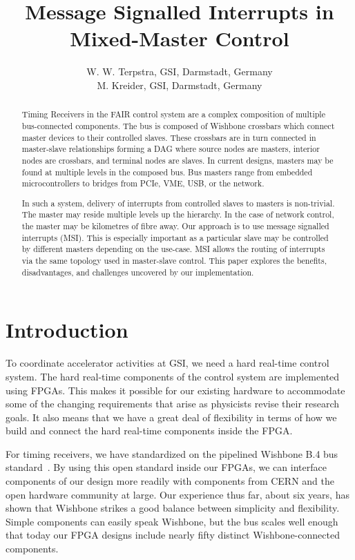 \documentclass[a4paper]{jacow}
\begin{document}
\title{Message Signalled Interrupts in Mixed-Master Control}

\author{W. W. Terpstra, GSI, Darmstadt, Germany\\
        M. Kreider, GSI, Darmstadt, Germany}
\maketitle

\begin{abstract}

Timing Receivers in the FAIR control system are a complex composition of
multiple bus-connected components. 
The bus is composed of Wishbone crossbars
which connect master devices to their controlled slaves. 
These crossbars are
in turn connected in master-slave relationships forming a DAG where source
nodes are masters, interior nodes are crossbars, and terminal nodes are
slaves. 
In current designs, masters may be found at multiple levels in the
composed bus. 
Bus masters range from embedded microcontrollers to 
bridges from PCIe, VME, USB, or the network. 

In such a
system, delivery of interrupts from controlled slaves to masters is
non-trivial. The master may reside multiple levels up the hierarchy. In the
case of network control, the master may be kilometres of fibre away. Our
approach is to use message signalled interrupts (MSI). This is especially
important as a particular slave may be controlled by different masters
depending on the use-case. MSI allows the routing of interrupts via the same
topology used in master-slave control. This paper explores the benefits,
disadvantages, and challenges uncovered by our implementation.
\end{abstract}

\section{Introduction}

To coordinate accelerator activities at GSI, we need a hard real-time control system.
The hard real-time components of the control system are implemented using FPGAs.
This makes it possible for our existing hardware to accommodate some of the
changing requirements that arise as physicists revise their research goals.
It also means that we have a great deal of flexibility in terms of how we
build and connect the hard real-time components inside the FPGA.

For timing receivers, we have standardized on the pipelined Wishbone B.4 bus
standard~\cite{wb}.
By using this open standard inside our FPGAs, we can interface components of our design
more readily with components from CERN and the open hardware community at large.
Our experience thus far, about six years, has shown that
Wishbone strikes a good balance between simplicity and flexibility.
Simple components can easily speak Wishbone, 
but the bus scales well enough that today our FPGA designs include nearly fifty
distinct Wishbone-connected components.
\end{document}
